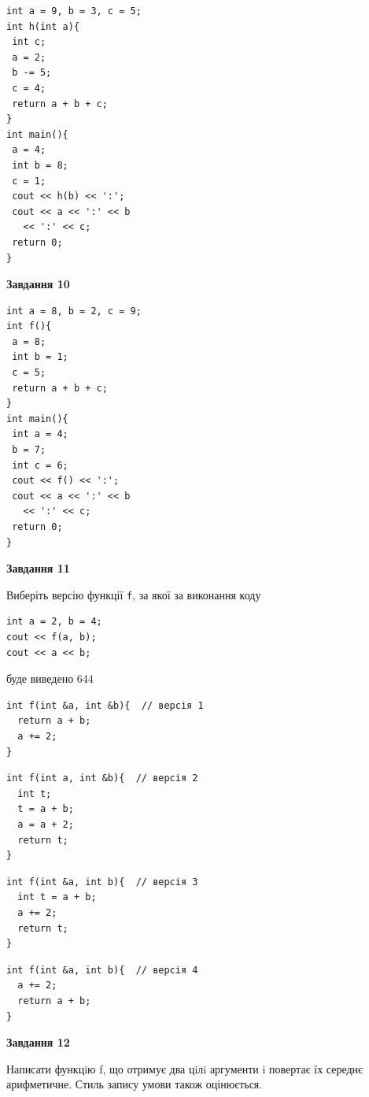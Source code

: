 \documentclass[12pt, ukrainian]{article}
\def\code#1{\Verb!#1!}
\begin{document}
{\begin {large}
\begin{minipage}[t]{7.0cm}
\begin{verbatim}
int a = 9, b = 3, c = 5;
int h(int a){
 int c;
 a = 2;
 b -= 5;
 c = 4;
 return a + b + c;
}
int main(){
 a = 4;
 int b = 8;
 c = 1;
 cout << h(b) << ':';
 cout << a << ':' << b 
   << ':' << c;
 return 0;
}
\end{verbatim}



\begin{center}
\textbf{Завдання 10}
\end{center}
\vspace{-8mm}

\begin{verbatim}
int a = 8, b = 2, c = 9;
int f(){
 a = 8;
 int b = 1;
 c = 5;
 return a + b + c;
}
int main(){
 int a = 4;
 b = 7;
 int c = 6;
 cout << f() << ':';
 cout << a << ':' << b 
   << ':' << c;
 return 0;
}
\end{verbatim}

\end{minipage}
\vline \hspace{1mm}
\begin{minipage}[t]{11.0cm}

\begin{center}
\textbf{Завдання 11}
\end{center}
Виберіть версію функції \code{f}, за якої за виконання коду
\begin{verbatim}
int a = 2, b = 4;
cout << f(a, b);
cout << a << b;
\end{verbatim}

буде виведено 644

\begin{verbatim}
int f(int &a, int &b){  // версія 1
  return a + b;
  a += 2;
}
\end{verbatim}

\vspace{-8mm}\begin{verbatim}
int f(int a, int &b){  // версія 2
  int t;
  t = a + b;
  a = a + 2;
  return t;
}
\end{verbatim}

\vspace{-8mm}\begin{verbatim}
int f(int &a, int b){  // версія 3
  int t = a + b;
  a += 2;
  return t;
}
\end{verbatim}

\vspace{-8mm}\begin{verbatim}
int f(int &a, int b){  // версія 4
  a += 2;
  return a + b;
}
\end{verbatim}



\begin{center}
\textbf{Завдання 12}
\end{center}

Написати функцiю f, що отримує два цiлi аргументи i повертає їх середнє арифметичне. Стиль запису умови також оцінюється.\par

\end{minipage}

\end {large}}
\newpage
\end{document}
